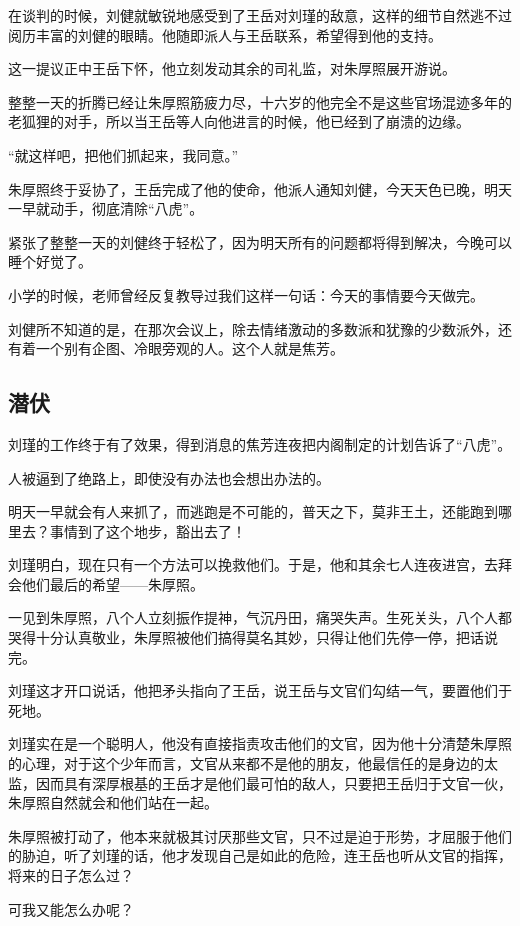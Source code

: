 \begin{multicols}{\theparacolNo}
在谈判的时候，刘健就敏锐地感受到了王岳对刘瑾的敌意，这样的细节自然逃不过阅历丰富的刘健的眼睛。他随即派人与王岳联系，希望得到他的支持。

这一提议正中王岳下怀，他立刻发动其余的司礼监，对朱厚照展开游说。

整整一天的折腾已经让朱厚照筋疲力尽，十六岁的他完全不是这些官场混迹多年的老狐狸的对手，所以当王岳等人向他进言的时候，他已经到了崩溃的边缘。

“就这样吧，把他们抓起来，我同意。”

朱厚照终于妥协了，王岳完成了他的使命，他派人通知刘健，今天天色已晚，明天一早就动手，彻底清除“八虎”。

紧张了整整一天的刘健终于轻松了，因为明天所有的问题都将得到解决，今晚可以睡个好觉了。

小学的时候，老师曾经反复教导过我们这样一句话：今天的事情要今天做完。

刘健所不知道的是，在那次会议上，除去情绪激动的多数派和犹豫的少数派外，还有着一个别有企图、冷眼旁观的人。这个人就是焦芳。

\subsection{潜伏}
刘瑾的工作终于有了效果，得到消息的焦芳连夜把内阁制定的计划告诉了“八虎”。

人被逼到了绝路上，即使没有办法也会想出办法的。

明天一早就会有人来抓了，而逃跑是不可能的，普天之下，莫非王土，还能跑到哪里去？事情到了这个地步，豁出去了！

刘瑾明白，现在只有一个方法可以挽救他们。于是，他和其余七人连夜进宫，去拜会他们最后的希望——朱厚照。

一见到朱厚照，八个人立刻振作提神，气沉丹田，痛哭失声。生死关头，八个人都哭得十分认真敬业，朱厚照被他们搞得莫名其妙，只得让他们先停一停，把话说完。

刘瑾这才开口说话，他把矛头指向了王岳，说王岳与文官们勾结一气，要置他们于死地。

刘瑾实在是一个聪明人，他没有直接指责攻击他们的文官，因为他十分清楚朱厚照的心理，对于这个少年而言，文官从来都不是他的朋友，他最信任的是身边的太监，因而具有深厚根基的王岳才是他们最可怕的敌人，只要把王岳归于文官一伙，朱厚照自然就会和他们站在一起。

朱厚照被打动了，他本来就极其讨厌那些文官，只不过是迫于形势，才屈服于他们的胁迫，听了刘瑾的话，他才发现自己是如此的危险，连王岳也听从文官的指挥，将来的日子怎么过？

可我又能怎么办呢？


\end{multicols}

